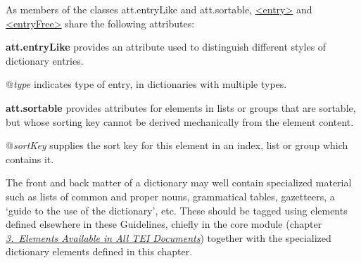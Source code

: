 As members of the classes \textsf{att.entryLike} and \textsf{att.sortable}, \hyperref[TEI.entry]{<entry>} and \hyperref[TEI.entryFree]{<entryFree>} share the following attributes:
\begin{sansreflist}
  
\item [\textbf{att.entryLike}] provides an attribute used to distinguish different styles of dictionary entries.\hfil\\[-10pt]\begin{sansreflist}
    \item[@{\itshape type}]
  indicates type of entry, in dictionaries with multiple types.
\end{sansreflist}  
\item [\textbf{att.sortable}] provides attributes for elements in lists or groups that are sortable, but whose sorting key cannot be derived mechanically from the element content.\hfil\\[-10pt]\begin{sansreflist}
    \item[@{\itshape sortKey}]
  supplies the sort key for this element in an index, list or group which contains it.
\end{sansreflist}  
\end{sansreflist}
\par
The front and back matter of a dictionary may well contain specialized material such as lists of common and proper nouns, grammatical tables, gazetteers, a ‘guide to the use of the dictionary’, etc. These should be tagged using elements defined elsewhere in these Guidelines, chiefly in the core module (chapter \textit{\hyperref[CO]{3.\ Elements Available in All TEI Documents}}) together with the specialized dictionary elements defined in this chapter.\par
